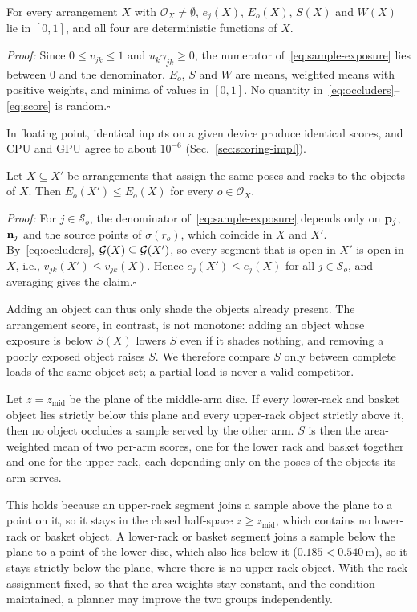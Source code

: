 \begin{proposition}
\label{prop:range}
For every arrangement $X$ with $\mathcal{O}_X\neq\emptyset$, $e_j(X)$, $E_o(X)$, $S(X)$ and $W(X)$ lie in $[0,1]$, and all four are deterministic functions of $X$.
\end{proposition}
\noindent\textit{Proof:}
Since $0\le v_{jk}\le1$ and $u_k\gamma_{jk}\ge0$, the numerator of~\eqref{eq:sample-exposure} lies between $0$ and the denominator.
$E_o$, $S$ and $W$ are means, weighted means with positive weights, and minima of values in $[0,1]$.
No quantity in~\eqref{eq:occluders}--\eqref{eq:score} is random.\hfill$\square$

In floating point, identical inputs on a given device produce identical scores, and CPU and GPU agree to about $10^{-6}$ (Sec.~\ref{sec:scoring-impl}).

\begin{proposition}
\label{prop:monotone}
Let $X\subseteq X'$ be arrangements that assign the same poses and racks to the objects of $X$.
Then $E_o(X')\le E_o(X)$ for every $o\in\mathcal{O}_X$.
\end{proposition}
\noindent\textit{Proof:}
For $j\in\mathcal{S}_o$, the denominator of~\eqref{eq:sample-exposure} depends only on $\mathbf{p}_j$, $\mathbf{n}_j$ and the source points of $\sigma(r_o)$, which coincide in $X$ and $X'$.
By~\eqref{eq:occluders}, $\mathcal{G}(X)\subseteq\mathcal{G}(X')$, so every segment that is open in $X'$ is open in $X$, i.e., $v_{jk}(X')\le v_{jk}(X)$.
Hence $e_j(X')\le e_j(X)$ for all $j\in\mathcal{S}_o$, and averaging gives the claim.\hfill$\square$

Adding an object can thus only shade the objects already present.
The arrangement score, in contrast, is not monotone: adding an object whose exposure is below $S(X)$ lowers $S$ even if it shades nothing, and removing a poorly exposed object raises $S$.
We therefore compare $S$ only between complete loads of the same object set; a partial load is never a valid competitor.

\begin{remark}
\label{rem:separable}
Let $z=z_{\mathrm{mid}}$ be the plane of the middle-arm disc.
If every lower-rack and basket object lies strictly below this plane and every upper-rack object strictly above it, then no object occludes a sample served by the other arm.
$S$ is then the area-weighted mean of two per-arm scores, one for the lower rack and basket together and one for the upper rack, each depending only on the poses of the objects its arm serves.
\end{remark}
\noindent This holds because an upper-rack segment joins a sample above the plane to a point on it, so it stays in the closed half-space $z\ge z_{\mathrm{mid}}$, which contains no lower-rack or basket object.
A lower-rack or basket segment joins a sample below the plane to a point of the lower disc, which also lies below it ($0.185<0.540$\,m), so it stays strictly below the plane, where there is no upper-rack object.
With the rack assignment fixed, so that the area weights stay constant, and the condition maintained, a planner may improve the two groups independently.

